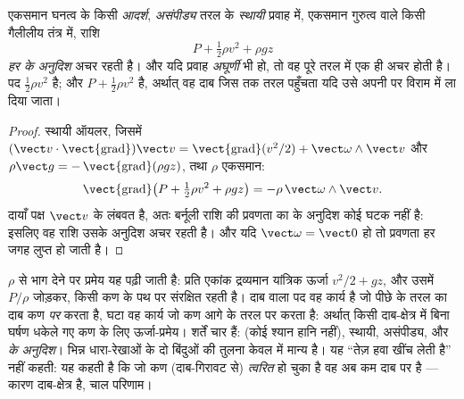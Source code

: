 \begin{theorem}[बर्नूली]\label{thm:b2:euler-bernoulli:bernoulli}
एकसमान घनत्व के किसी \emph{आदर्श}, \emph{असंपीड्य} तरल के \emph{स्थायी}
प्रवाह में, एकसमान गुरुत्व वाले किसी गैलीलीय तंत्र में, राशि
\[
P + \tfrac12\rho v^2 + \rho gz
\]
\emph{हर  के अनुदिश} अचर रहती है। और यदि प्रवाह
\emph{अघूर्णी} भी हो, तो वह पूरे तरल में एक ही अचर होती है।
पद $\tfrac12\rho v^2$ \emph{} है; और $P + \tfrac12\rho v^2$
\emph{} है, अर्थात् वह दाब जिस तक तरल पहुँचता यदि उसे अपनी
 पर विराम में ला दिया जाता।
\end{theorem}

\begin{proof}
स्थायी ऑयलर, जिसमें $(\vect v\cdot\operatorname{\vect{grad}})\vect v =
\operatorname{\vect{grad}}(v^2/2) + \vect\omega\wedge\vect v$ और $\rho\vect g =
-\operatorname{\vect{grad}}(\rho gz)$, तथा $\rho$ एकसमान:
\[
\operatorname{\vect{grad}}\bigl(P + \tfrac12\rho v^2 + \rho gz\bigr) = -\rho\,
\vect\omega\wedge\vect v .
\]
दायाँ पक्ष $\vect v$ के लंबवत है, अतः बर्नूली राशि की प्रवणता का
 के अनुदिश कोई घटक नहीं है: इसलिए वह राशि
उसके अनुदिश अचर रहती है। और यदि $\vect\omega = \vect 0$ हो तो प्रवणता
हर जगह लुप्त हो जाती है।
\end{proof}

\begin{remark}[बर्नूली क्या कहती है और क्या नहीं]\label{rem:b2:euler-bernoulli:meaning}
$\rho$ से भाग देने पर प्रमेय यह पढ़ी जाती है: प्रति एकांक द्रव्यमान
यांत्रिक ऊर्जा $v^2/2 + gz$, और उसमें $P/\rho$ जोड़कर, किसी कण के पथ पर संरक्षित रहती है।
दाब वाला पद वह कार्य है जो पीछे के तरल का दाब कण \emph{पर} करता है,
घटा वह कार्य जो कण आगे के तरल पर करता है: अर्थात् किसी दाब-क्षेत्र में
बिना घर्षण धकेले गए कण के लिए ऊर्जा-प्रमेय। शर्तें चार हैं:  (कोई
श्यान हानि नहीं), स्थायी, असंपीड्य, और \emph{ के अनुदिश}। भिन्न
धारा-रेखाओं के दो बिंदुओं की तुलना केवल  में
मान्य है। यह ``तेज़ हवा खींच लेती है'' नहीं कहती: यह कहती है कि जो कण
(दाब-गिरावट से) \emph{त्वरित} हो चुका है वह अब कम दाब पर है
--- कारण दाब-क्षेत्र है, चाल परिणाम।
\end{remark}

